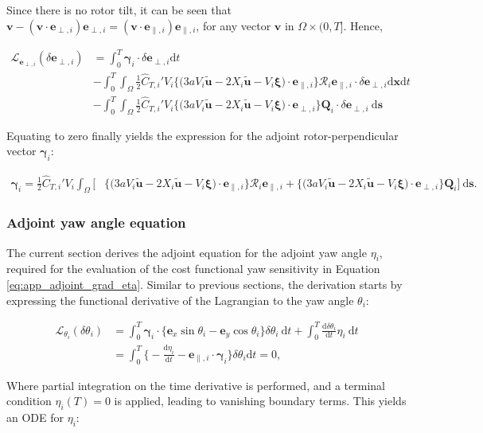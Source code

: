 \documentclass[energies,article,submit,moreauthors,latex,10pt,a4paper]{mdpi}
\newcommand{\ds}{~\text{d}\boldsymbol{s}}
\newcommand{\bs}[1]{\boldsymbol{#1}}
\newcommand{\dx}{\text{d}\boldsymbol{x}}
\newcommand{\dt}{\text{d}t}
\newcommand{\ddt}[1]{\frac{\text{d} #1}{\text{d} t}}
\newcommand{\stint}{\int_{0}^{T} \int_{\Omega}}
\newcommand{\sint}{\int_{\Omega}}
\newcommand{\Tint}{\int_{0}^{T}}
\newcommand{\utilde}{\widetilde{\bs{u}}}
\newcommand{\ctihat}{\widehat{C}_{T,i}'}
\newcommand{\R}{\mathscr{R}}
\newcommand{\Lagr}{\mathscr{L}}
\newcommand{\eperpi}{\bs{e}_{\perp,i}}
\newcommand{\etransi}{\bs{e}_{\parallel,i}}
\begin{document}
\noindent Since there is no rotor tilt, it can be seen that $\bs{v} - ( \bs{v} \cdot \eperpi ) \eperpi = (\bs{v} \cdot \etransi) \etransi$, for any vector $\bs{v}$ in $\Omega \times (0, T]$. Hence, 

\begin{align}
\Lagr_{\eperpi}(\delta \eperpi) &= \Tint \bs{\gamma}_i \cdot \delta \eperpi \dt \nonumber\\
& - \stint \frac{1}{2} \ctihat V_i \bigg\{ \bigg(3a V_i \utilde  - 2 X_i \utilde - V_i\bs{\xi} \bigg) \cdot \etransi   \bigg\} \R_i \etransi \cdot \delta \eperpi \dx \dt \nonumber \\
& - \stint \frac{1}{2} \ctihat V_i \bigg\{ \bigg(3aV_i \utilde  -2 X_i \utilde - V_i\bs{\xi} \bigg) \cdot \eperpi \bigg\} \bs{Q}_i \cdot \delta \eperpi \ds 
\end{align}

\noindent Equating to zero finally yields the expression for the adjoint rotor-perpendicular vector $\bs{\gamma}_i$:

\begin{align}
\bs{\gamma}_i = \frac{1}{2} \ctihat V_i \sint \bigg[ & \bigg\{ \bigg(3a V_i \utilde  - 2 X_i \utilde - V_i\bs{\xi} \bigg) \cdot \etransi   \bigg\} \R_i \etransi + \bigg\{ \bigg(3aV_i \utilde  -2 X_i \utilde - V_i\bs{\xi} \bigg) \cdot \eperpi \bigg\} \bs{Q}_i \bigg] \ds. \label{eq:app_adj_gamma_final}  
\end{align}

\subsubsection{Adjoint yaw angle equation}
\noindent The current section derives the adjoint equation for the adjoint yaw angle $\eta_i$, required for the evaluation of the cost functional yaw sensitivity in Equation \eqref{eq:app_adjoint_grad_eta}. Similar to previous sections, the derivation starts by expressing the functional derivative of the Lagrangian to the yaw angle $\theta_i$: 

\begin{align}
\Lagr_{\theta_i}(\delta \theta_i) &= 
\Tint \bs{\gamma}_i \cdot \bigg\{ \bs{e}_x \sin \theta_i - \bs{e}_y \cos \theta_i  \bigg\} \delta \theta_i ~\dt + \Tint \ddt{\delta \theta_i} \eta_i ~\dt \\ 
&= \Tint \bigg\{ -\ddt{\eta_i} - \etransi \cdot \bs{\gamma}_i   \bigg\} \delta \theta_i \dt = 0,
\end{align}

\noindent Where partial integration on the time derivative is performed, and a terminal condition $\eta_i(T) = 0$ is applied, leading to vanishing boundary terms. This yields an ODE for $\eta_i$:
\end{document}
